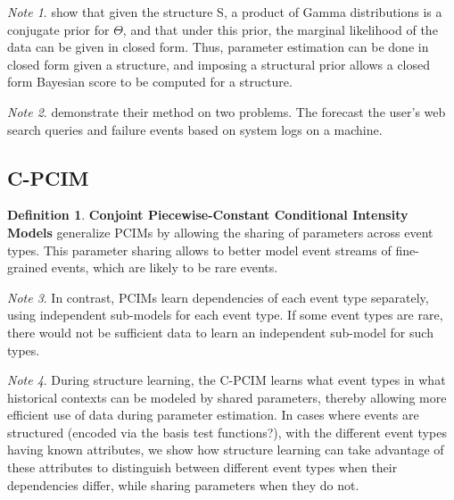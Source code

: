 \documentclass[12pt]{article}
\theoremstyle{plain}
\theoremstyle{definition}
\newtheorem{definition}{Definition}
\theoremstyle{remark}
\newtheorem*{note}{Note}
\begin{document}
\begin{note}
  \cite{gunmeexu11} show that given the structure S, a product of Gamma
  distributions is a conjugate prior for $\Theta$, and that under this prior,
  the marginal likelihood of the data can be given in closed form.
  Thus, parameter estimation can be done in closed form given a structure, and
  imposing a structural prior allows a closed form Bayesian score to be computed
  for a structure.
\end{note}

\begin{note}
  \cite{gunmeexu11} demonstrate their method on two problems. The forecast the
  user's web search queries and failure events based on system logs on a
  machine.
\end{note}

\subsection{C-PCIM}

\begin{definition}
  \textbf{Conjoint Piecewise-Constant Conditional Intensity Models} generalize
  PCIMs by allowing the sharing of parameters across event types. This parameter
  sharing allows to better model event streams of fine-grained events, which
  are likely to be rare events.
\end{definition}

\begin{note}
  In contrast, PCIMs learn dependencies of each event type separately, using
  independent sub-models for each event type. If some event types are rare,
  there would not be sufficient data to learn an independent sub-model for
  such types.
\end{note}

\begin{note}
  During structure learning, the C-PCIM learns what event types in what
  historical contexts can be modeled by shared parameters, thereby allowing more
  efficient use of data during parameter estimation. In cases where events are
  structured (encoded via the basis test functions?), with the different event
  types having known attributes, we show how structure learning can take
  advantage of these attributes to distinguish between different event types
  when their dependencies differ, while sharing parameters when they do not.
\end{note}
\end{document}
